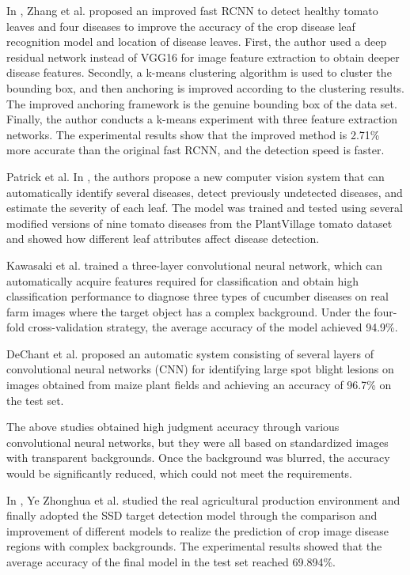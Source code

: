 \documentclass[a4paper,fleqn]{cas-sc}
\begin{document}
In \cite{zhang2020deep}, Zhang et al. proposed an improved fast RCNN to detect healthy tomato leaves and four diseases to improve the accuracy of the crop disease leaf recognition model and location of disease leaves. First, the author used a deep residual network instead of VGG16 for image feature extraction to obtain deeper disease features. Secondly, a k-means clustering algorithm is used to cluster the bounding box, and then anchoring is improved according to the clustering results. The improved anchoring framework is the genuine bounding box of the data set. Finally, the author conducts a k-means experiment with three feature extraction networks. The experimental results show that the improved method is 2.71\% more accurate than the original fast RCNN, and the detection speed is faster.

Patrick et al. In \cite{wspanialy2020detection}, the authors propose a new computer vision system that can automatically identify several diseases, detect previously undetected diseases, and estimate the severity of each leaf. The model was trained and tested using several modified versions of nine tomato diseases from the PlantVillage tomato dataset and showed how different leaf attributes affect disease detection.

Kawasaki et al. \cite{kawasaki2015basic} trained a three-layer convolutional neural network, which can automatically acquire features required for classification and obtain high classification performance to diagnose three types of cucumber diseases on real farm images where the target object has a complex background. Under the four-fold cross-validation strategy, the average accuracy of the model achieved 94.9\%.

DeChant et al. \cite{dechant2017automated} proposed an automatic system consisting of several layers of convolutional neural networks (CNN) for identifying large spot blight lesions on images obtained from maize plant fields and achieving an accuracy of 96.7\% on the test set.

The above studies obtained high judgment accuracy through various convolutional neural networks, but they were all based on standardized images with transparent backgrounds. Once the background was blurred, the accuracy would be significantly reduced, which could not meet the requirements. 

In \cite{YeZhonghua}, Ye Zhonghua et al. studied the real agricultural production environment and finally adopted the SSD target detection model through the comparison and improvement of different models to realize the prediction of crop image disease regions with complex backgrounds. The experimental results showed that the average accuracy of the final model in the test set reached 69.894\%.
\end{document}
